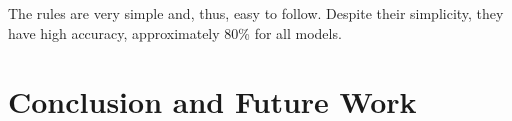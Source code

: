 The rules are very simple and, thus, easy to follow. Despite their simplicity,
they have high accuracy, approximately 80\% for all models.  

%


%
%

%
%
%
%
%
%
%

\section{Conclusion and Future Work} \label{sec:conclusion}

